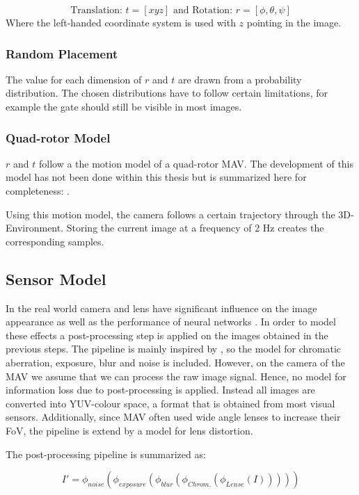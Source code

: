 $$
\text{Translation: }t = [x y z] \text{ and Rotation: } r = [\phi, \theta, \psi]
$$
Where the left-handed coordinate system is used with $z$ pointing in the image.

\subsubsection{Random Placement}
	
The value for each dimension of $r$ and $t$ are drawn from a probability distribution. The chosen distributions have to follow certain limitations, for example the gate should still be visible in most images.
	
\subsubsection{Quad-rotor Model}
	
$r$ and $t$ follow a the motion model of a quad-rotor \ac{MAV}.  The development of this model has not been done within this thesis but is summarized here for completeness: .

Using this motion model, the camera follows a certain trajectory through the 3D-Environment. Storing the current image at a frequency of 2 Hz creates the corresponding samples.
	
\subsection{Sensor Model}

In the real world camera and lens have significant influence on the image appearance as well as the performance of neural networks \cite{Andreopoulos2012,Dodge2016a}. In order to model these effects a post-processing step is applied on the images obtained in the previous steps. The pipeline is mainly inspired by \cite{Carlson2018}, so the model for chromatic aberration, exposure, blur and noise is included. However, on the camera of the \ac{MAV} we assume that we can process the raw image signal. Hence, no model for information loss due to post-processing is applied. Instead all images are converted into YUV-colour space, a format that is obtained from most visual sensors. Additionally, since \ac{MAV} often used wide angle lenses to increase their \ac{FoV}, the pipeline is extend by a model for lens distortion. 

The post-processing pipeline is summarized as:

\begin{equation}
	I' = \phi_{noise}(\phi_{exposure}(\phi_{blur}(\phi_{Chrom.}(\phi_{Lense}(I)))))
	\label{eq:postprocess}
\end{equation}

